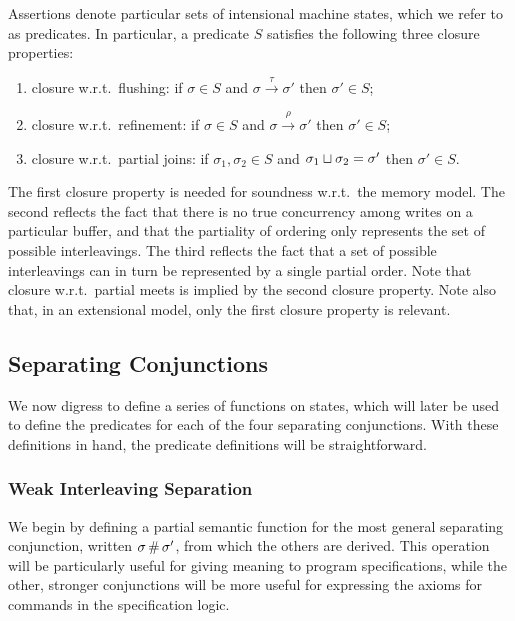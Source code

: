 \documentclass[11pt]{article}
\begin{document}
Assertions denote particular sets of intensional machine states, which we refer to as predicates. In particular, a predicate $S$ satisfies the following three closure properties: \begin{enumerate}
	\item closure w.r.t.~flushing: if $\sigma \in S$ and $\sigma \stackrel{\tau}{\rightarrow} \sigma'$ then $\sigma' \in S$; 
	\item closure w.r.t.~refinement: if $\sigma \in S$ and $\sigma \stackrel{\rho}{\rightarrow} \sigma'$ then $\sigma' \in S$; 
	\item closure w.r.t.~partial joins: if $\sigma_1,\sigma_2 \in S$ and $\sigma_1 \sqcup \sigma_2 = \sigma'$ then $\sigma' \in S$. 
\end{enumerate} The first closure property is needed for soundness w.r.t.~the memory model. The second reflects the fact that there is no true concurrency among writes on a particular buffer, and that the partiality of ordering only represents the set of possible interleavings. The third reflects the fact that a set of possible interleavings can in turn be represented by a single partial order. Note that closure w.r.t.~partial meets is implied by the second closure property. Note also that, in an extensional model, only the first closure property is relevant. 

\subsection{Separating Conjunctions}

We now digress to define a series of functions on states, which will later be used to define the predicates for each of the four separating conjunctions. With these definitions in hand, the predicate definitions will be straightforward. 

\subsubsection{Weak Interleaving Separation}

We begin by defining a partial semantic function for the most general separating conjunction, written $\sigma \operatorname{\#} \sigma'$, from which the others are derived. This operation will be particularly useful for giving meaning to program specifications, while the other, stronger conjunctions will be more useful for expressing the axioms for commands in the specification logic. 
\end{document}
